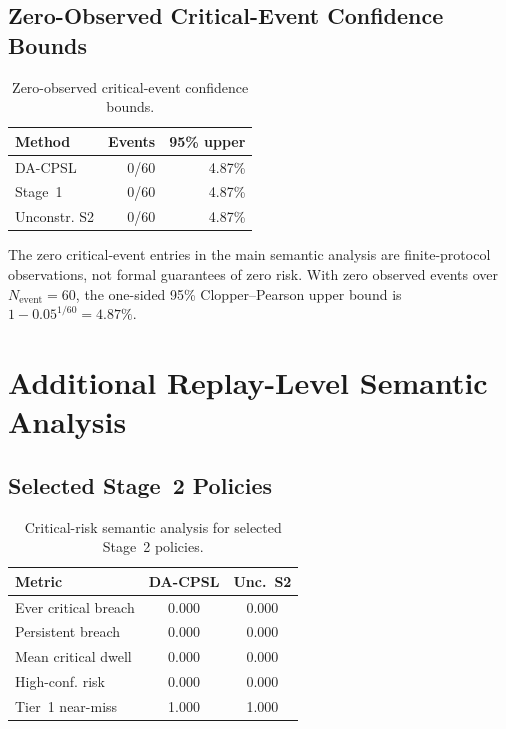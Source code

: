 \documentclass[sigconf,review,anonymous]{acmart}
\begin{document}
\subsection{Zero-Observed Critical-Event Confidence Bounds}
\label{app:zero-event-confidence-bounds}

\begin{table}[!htbp]
\centering
\caption{Zero-observed critical-event confidence bounds.}
\label{tab:app-zero-event-confidence-bounds}
\begingroup
\small
\setlength{\tabcolsep}{4pt}
\renewcommand{\arraystretch}{1.10}
\begin{tabular*}{\columnwidth}{@{\extracolsep{\fill}}lrr@{}}
\toprule
Method & Events & 95\% upper \\
\midrule
DA-CPSL & 0/60 & 4.87\% \\
Stage~1 & 0/60 & 4.87\% \\
Unconstr. S2 & 0/60 & 4.87\% \\
\bottomrule
\end{tabular*}
\endgroup
\end{table}

The zero critical-event entries in the main semantic analysis are
finite-protocol observations, not formal guarantees of zero risk. With
zero observed events over \(N_{\mathrm{event}}=60\), the one-sided
95\% Clopper--Pearson upper bound is \(1-0.05^{1/60}=4.87\%\).

\section{Additional Replay-Level Semantic Analysis}
\label{app:additional-semantic-analysis}

\subsection{Selected Stage~2 Policies}
\label{app:selected-stage2-semantic-analysis}

\begin{table}[!htbp]
\centering
\caption{Critical-risk semantic analysis for selected Stage~2 policies.}
\label{tab:app-rq3-semantic-full-analysis}
\begingroup
\small
\setlength{\tabcolsep}{4pt}
\renewcommand{\arraystretch}{1.10}
\begin{tabular*}{\columnwidth}{@{\extracolsep{\fill}}lcc@{}}
\toprule
Metric & DA-CPSL & Unc.~S2 \\
\midrule
Ever critical breach & 0.000 & 0.000 \\
Persistent breach & 0.000 & 0.000 \\
Mean critical dwell & 0.000 & 0.000 \\
High-conf. risk & 0.000 & 0.000 \\
Tier~1 near-miss & 1.000 & 1.000 \\
\bottomrule
\end{tabular*}
\endgroup
\end{table}
\end{document}
